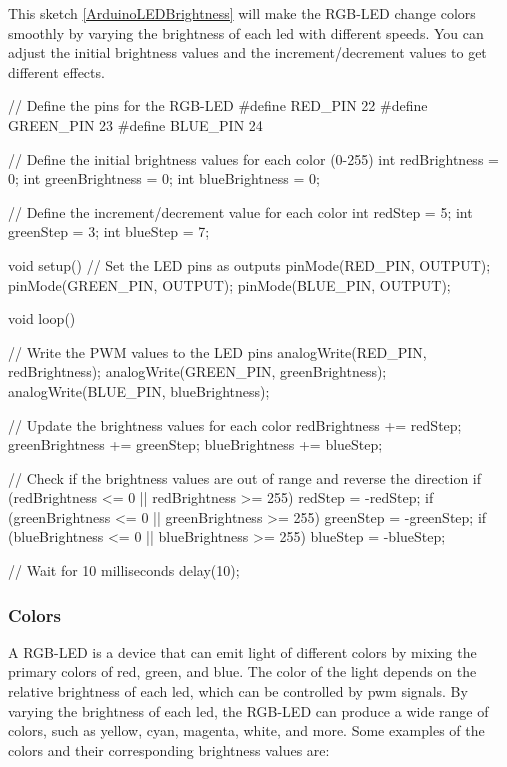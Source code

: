 \bigskip

This sketch \ref{ArduinoLEDBrightness} will make the RGB-LED change colors smoothly by varying the brightness of each \ac{led} with different speeds. You can adjust the initial brightness values and the increment/decrement values to get different effects.

{
    \begin{Arduino}
// Define the pins for the RGB-LED
#define RED_PIN 22
#define GREEN_PIN 23
#define BLUE_PIN 24
        
// Define the initial brightness values for each color (0-255)
int redBrightness = 0;
int greenBrightness = 0;
int blueBrightness = 0;
        
// Define the increment/decrement value for each color
int redStep = 5;
int greenStep = 3;
int blueStep = 7;
        
void setup() {
    // Set the LED pins as outputs
    pinMode(RED_PIN, OUTPUT);
    pinMode(GREEN_PIN, OUTPUT);
    pinMode(BLUE_PIN, OUTPUT);
}
        
void loop() {
    // Write the PWM values to the LED pins
    analogWrite(RED_PIN, redBrightness);
    analogWrite(GREEN_PIN, greenBrightness);
    analogWrite(BLUE_PIN, blueBrightness);
            
    // Update the brightness values for each color
    redBrightness += redStep;
    greenBrightness += greenStep;
    blueBrightness += blueStep;
            
    // Check if the brightness values are out of range and reverse the direction
    if (redBrightness <= 0 || redBrightness >= 255) {
        redStep = -redStep;
    }
    if (greenBrightness <= 0 || greenBrightness >= 255) {
        greenStep = -greenStep;
    }
    if (blueBrightness <= 0 || blueBrightness >= 255) {
        blueStep = -blueStep;
    }
                    
    // Wait for 10 milliseconds
    delay(10);
}
  \end{Arduino}
  \label{ArduinoLEDBrightness}
}
        
  \bigskip
        
        
\subsubsection{Colors}
        
        A RGB-LED is a device that can emit light of different colors by mixing the primary colors of red, green, and blue. The color of the light depends on the relative brightness of each \ac{led}, which can be controlled by \ac{pwm} signals. By varying the brightness of each \ac{led}, the RGB-LED can produce a wide range of colors, such as yellow, cyan, magenta, white, and more. Some examples of the colors and their corresponding brightness values are:
        

